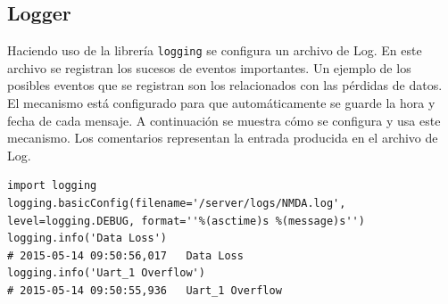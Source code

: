 	\subsection{Logger}
		Haciendo uso de la librería \texttt{logging}\cite{py_logging} se configura un archivo de Log. En este archivo se registran los sucesos
		de eventos importantes. Un ejemplo de los posibles eventos que se registran son los relacionados con las pérdidas de datos. El
		mecanismo está configurado para que automáticamente se guarde la hora y fecha de cada mensaje. A continuación se muestra cómo se
		configura y usa este mecanismo. Los comentarios representan la entrada producida en el archivo de Log.
		\begin{lstlisting}[style=myPython]
import logging
logging.basicConfig(filename='/server/logs/NMDA.log', level=logging.DEBUG, format=''%(asctime)s %(message)s'')
logging.info('Data Loss')   
# 2015-05-14 09:50:56,017   Data Loss
logging.info('Uart_1 Overflow') 
# 2015-05-14 09:50:55,936   Uart_1 Overflow
		\end{lstlisting}
